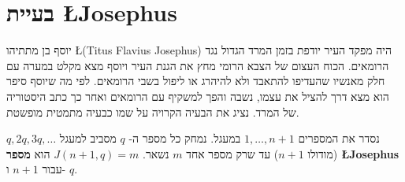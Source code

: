 
\section{בעיית \L{\normalsize Josephus}}\label{s.josephus}

יוסף בן מתתיהו 
\L{(Titus Flavius Josephus)}
היה מפקד העיר יודפת בזמן המרד הגדול נגד הרומאים. הכוח העצום של הצבא הרומי מחץ את הגנת העיר ויוסף מצא מקלט במערה עם חלק מאנשיו שהעדיפו להתאבד ולא להיהרג או ליפול בשבי הרומאים. לפי מה שיוסף סיפר הוא מצא דרך להציל את עצמו, נשבה והפך למשקיף עם הרומאים ואחר כך כתב היסטוריה של המרד. נציג את הבעיה הקרויה על שמו כבעיה מתמטית מופשטת.
\begin{definition}
נסדר את המספרים
$1,\ldots,n\!+\!1$
במעגל. נמחק כל מספר ה-%
$q$
מסביב למעגל
$q, 2q, 3q, \ldots$
(מודולו
$n\!+\!1$)
עד שרק מספר אחד 
$m$
נשאר.
$J(n+1,q)=m$
הוא
\textbf{מספר \L{Josephus}}
עבור
$n+1$
ו-%
$q$.
\end{definition}
